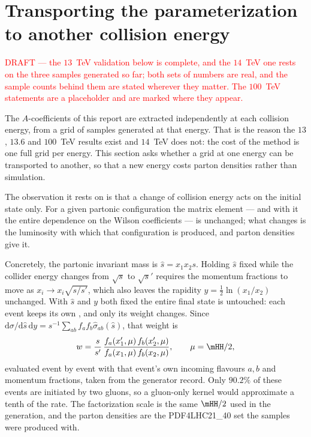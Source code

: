 \section{Transporting the parameterization to another collision energy}
\label{sec:energy_transport}

\textcolor{red}{DRAFT --- the $13$~TeV validation below is complete, and the $14$~TeV one
rests on the three samples generated so far; both sets of numbers are real, and the
sample counts behind them are stated wherever they matter. The $100$~TeV statements are a
placeholder and are marked where they appear.}

The $A$-coefficients of this report are extracted independently at each collision energy,
from a grid of samples generated at that energy. That is the reason the $13$, $13.6$ and
$100$~TeV results exist and $14$~TeV does not: the cost of the method is one full grid per
energy. This section asks whether a grid at one energy can be transported to another, so
that a new energy costs parton densities rather than simulation.

The observation it rests on is that a change of collision energy acts on the initial state
only. For a given partonic configuration the matrix element --- and with it the entire
dependence on the Wilson coefficients --- is unchanged; what changes is the luminosity with
which that configuration is produced, and parton densities give it.

Concretely, the partonic invariant mass is $\hat{s} = x_1 x_2 s$. Holding $\hat{s}$ fixed
while the collider energy changes from $\sqrt{s}$ to $\sqrt{s}'$ requires the momentum
fractions to move as $x_i \to x_i \sqrt{s/s'}$, which also leaves the rapidity
$y = \tfrac{1}{2}\ln(x_1/x_2)$ unchanged. With $\hat{s}$ and $y$ both fixed the entire
final state is untouched: each event keeps its own \mHH, and only its weight changes.
Since $\mathrm{d}\sigma/\mathrm{d}\hat{s}\,\mathrm{d}y = s^{-1}\sum_{ab} f_a f_b
\hat{\sigma}_{ab}(\hat{s})$, that weight is
%
\begin{equation}
w = \frac{s}{s'}\,
    \frac{f_a(x_1',\mu)\,f_b(x_2',\mu)}{f_a(x_1,\mu)\,f_b(x_2,\mu)},
\qquad \mu = \mHH/2 ,
\label{eq:energy_kernel}
\end{equation}
%
evaluated event by event with that event's own incoming flavours $a,b$ and momentum
fractions, taken from the generator record. Only $90.2\%$ of these events are initiated by two gluons, so a gluon-only kernel
would approximate a tenth of the rate. The factorization scale is the same $\mHH/2$ used in the
generation, and the parton densities are the \textsc{PDF4LHC21\_40} set the samples were
produced with.

